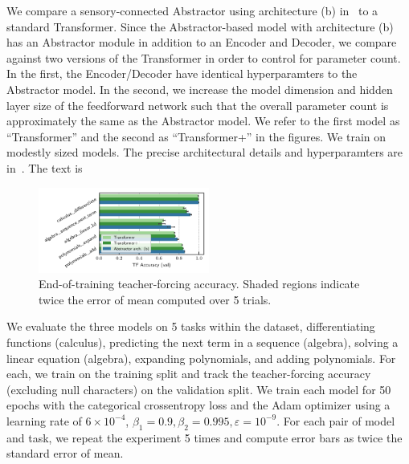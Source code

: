 We compare a sensory-connected Abstractor using architecture (b) in~ to a standard Transformer. Since the Abstractor-based model with architecture (b) has an Abstractor module in addition to an Encoder and Decoder, we compare against two versions of the Transformer in order to control for parameter count. In the first, the Encoder/Decoder have identical hyperparamters to the Abstractor model. In the second, we increase the model dimension and hidden layer size of the feedforward network such that the overall parameter count is approximately the same as the Abstractor model. We refer to the first model as ``Transformer'' and the second as ``Transformer+'' in the figures. We train on modestly sized models. The precise architectural details and hyperparamters are in~. The text is 

\begin{figure}
    \centering
    \includegraphics[width=0.5\textwidth]{figures/experiments/math_metrics.pdf}
    \caption{\footnotesize End-of-training teacher-forcing accuracy. Shaded regions indicate twice the error of mean computed over 5 trials.}\label{fig:math_metrics}
\end{figure}

We evaluate the three models on 5 tasks within the dataset, differentiating functions (calculus), predicting the next term in a sequence (algebra), solving a linear equation (algebra), expanding polynomials, and adding polynomials. For each, we train on the training split and track the teacher-forcing accuracy (excluding null characters) on the validation split. We train each model for 50 epochs with the categorical crossentropy loss and the Adam optimizer using a learning rate of $6 \times 10^{-4}$, $\beta_1 = 0.9, \beta_2 = 0.995, \varepsilon = 10^{-9}$. For each pair of model and task, we repeat the experiment 5 times and compute error bars as twice the standard error of mean.

